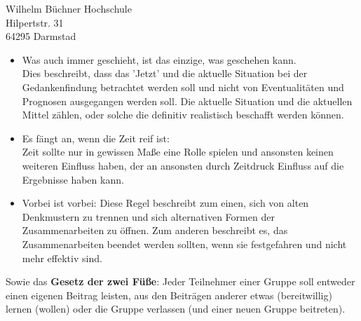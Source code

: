 \documentclass[
    version=last,           %
    DIV=13,                 %
    BCOR=0mm,               %
    paper=a4,               %
    fontsize=12pt,          %
    firsthead=on,           %
    firstfoot=on,           %
    pagenumber=on,i         %
    parskip=half,           %
    enlargefirstpage=,      %
    firsthead=on,           %
    fromrule=afteraddress,  %
    priority=off,           %
    backaddress=true,       %
    refline=dateright,      %
	fromalign=right,	    %
    fromemail=on,i          %
    fromurl=on,             %
    frombank=on,
    fromphone=on,           %
    frommobilephone=on      %
    fromlogo=on,            %
    addrfield=on,           %
    subject=untitled,  %
    foldmarks=off,          %
    numericaldate=off,      %
	pagenumber=right,	        %
	parskip=half,	        %
    headsep=false,          %
    footsepline=true,       %
    foldmarks=off,		    %
	]{scrlttr2}
\begin{document}
\begin{letter} {Wilhelm Büchner Hochschule \\
Hilpertstr. 31\\
64295 Darmstad}
\begin{itemize}
\begin{enumerate}
\begin{itemize}
                        wenn es nicht oder insbesondere wenn es nicht dem
                        standard entspricht.
                    \item Was auch immer geschieht, ist das einzige, was
                        geschehen kann. \\
                        Dies beschreibt, dass das 'Jetzt' und die aktuelle
                        Situation bei der Gedankenfindung betrachtet werden soll
                        und nicht von Eventualitäten und Prognosen ausgegangen
                        werden soll. Die aktuelle Situation und die aktuellen
                        Mittel zählen, oder solche die definitiv realistisch
                        beschafft werden können.
                    \item Es fängt an, wenn die Zeit reif ist: \\
                        Zeit sollte nur in gewissen Maße eine Rolle spielen und
                        ansonsten keinen weiteren Einfluss haben, der an ansonsten
                        durch Zeitdruck Einfluss auf die Ergebnisse haben kann.
                    \item Vorbei ist vorbei: Diese Regel beschreibt zum einen,
                        sich von alten Denkmustern zu trennen und sich
                        alternativen Formen der Zusammenarbeiten zu öffnen. Zum
                        anderen beschreibt es, das Zusammenarbeiten beendet
                        werden sollten, wenn sie festgefahren und nicht mehr
                        effektiv sind.
                \end{itemize}
                Sowie das \textbf{Gesetz der zwei Füße}: Jeder Teilnehmer einer
                Gruppe soll entweder einen eigenen Beitrag leisten, aus den
                Beiträgen anderer etwas (bereitwillig) lernen (wollen) oder die
                Gruppe verlassen (und einer neuen Gruppe beitreten).


\end{enumerate}
\end{itemize}
\end{letter}
\end{document}
